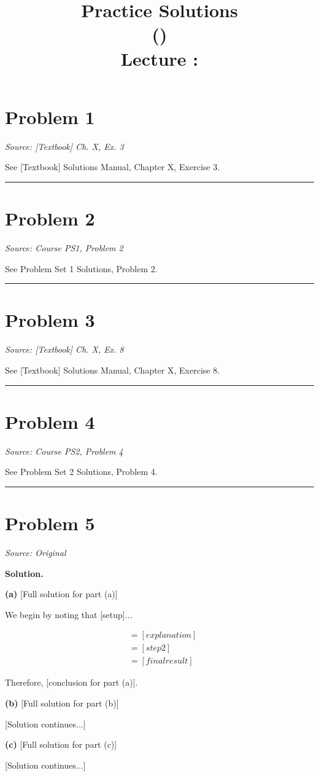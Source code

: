 \documentclass[11pt,a4paper]{article}
\title{\textbf{Practice Solutions} \\ \coursename{} (\coursenumber) \\ Lecture \lecturenum: \lecturetopic}
\author{}
\date{\semester}
\newenvironment{solution}{%
    \par\medskip\noindent\textbf{Solution.}\enspace
}{%
    \par\medskip
}
\begin{document}
\maketitle


\section*{Problem 1}
\textit{Source: [Textbook] Ch. X, Ex. 3}

See [Textbook] Solutions Manual, Chapter X, Exercise 3.

\bigskip
\hrule
\bigskip

\section*{Problem 2}
\textit{Source: Course PS1, Problem 2}

See Problem Set 1 Solutions, Problem 2.

\bigskip
\hrule
\bigskip

\section*{Problem 3}
\textit{Source: [Textbook] Ch. X, Ex. 8}

See [Textbook] Solutions Manual, Chapter X, Exercise 8.

\bigskip
\hrule
\bigskip

\section*{Problem 4}
\textit{Source: Course PS2, Problem 4}

See Problem Set 2 Solutions, Problem 4.

\bigskip
\hrule
\bigskip

\section*{Problem 5}
\textit{Source: Original}

\begin{solution}
\textbf{(a)} [Full solution for part (a)]

We begin by noting that [setup]...

\begin{align*}
    [derivation line 1] &= [explanation] \\
    &= [step 2] \\
    &= [final result]
\end{align*}

Therefore, [conclusion for part (a)].

\medskip
\textbf{(b)} [Full solution for part (b)]

[Solution continues...]

\medskip
\textbf{(c)} [Full solution for part (c)]

[Solution continues...]
\end{solution}
\end{document}
